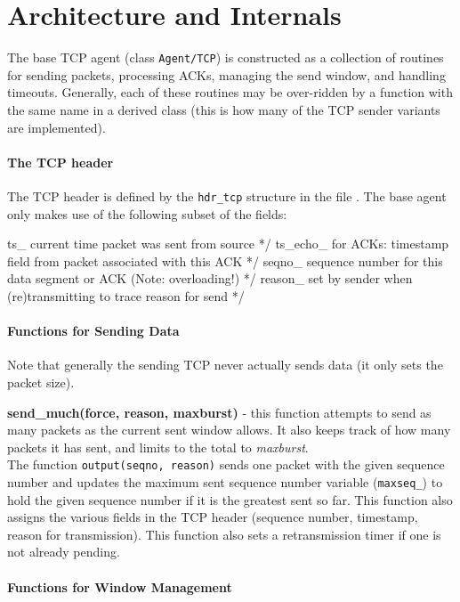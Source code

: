 \section{Architecture and Internals}
\label{sec:tcparchitecture}

The base TCP agent (class {\tt Agent/TCP}) is constructed
as a collection of routines for sending packets, processing ACKs,
managing the send window, and handling timeouts.
Generally, each of these routines may be over-ridden by a
function with the same name in a derived class (this is how
many of the TCP sender variants are implemented).

\paragraph{The TCP header}
The TCP header is defined by the {\tt hdr\_tcp} structure
in the file .
The base agent only makes use of the following subset of the fields:
\begin{program}
ts_     \* current time packet was sent from source */
ts_echo_ \* for ACKs: timestamp field from packet associated with this ACK */
seqno_ \* sequence number for this data segment or ACK (Note: overloading!) */
reason_ \* set by sender when (re)transmitting to trace reason for send */
\end{program}

\paragraph{Functions for Sending Data}
Note that generally the sending TCP never actually sends
data (it only sets the packet size).

{\bf send\_much(force, reason, maxburst)} - this function
attempts to send as many packets as the current sent window allows.
It also keeps track of how many packets it has sent, and limits to the
total to {\em maxburst}. \\
The function {\tt output(seqno, reason)} sends one packet
with the given sequence number and updates the maximum sent sequence
number variable ({\tt maxseq\_}) to hold the given sequence number if
it is the greatest sent so far.
This function also assigns the various fields in the TCP
header (sequence number, timestamp, reason for transmission).
This function also sets a retransmission timer if one is not already
pending.

\paragraph{Functions for Window Management}

